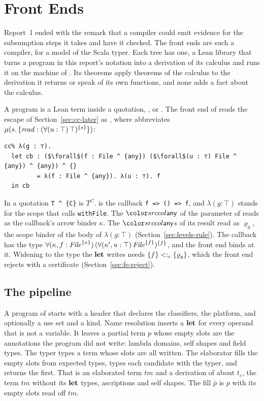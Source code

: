 \section{Front Ends}\label{sec:frontends}
\mathplain

Report~1 ended with the remark that a compiler could emit evidence for the subsumption steps it takes and have it checked. The front ends are such a compiler, for a model of the Scala typer. Each tree has one, a Lean library that turns a program in this report's notation into a derivation of its calculus and runs it on the machine of \DOTMNF. Its theorems apply theorems of the calculus to the derivation it returns or speak of its own functions, and none adds a fact about the calculus.

A program is a Lean term inside a quotation, ,  or . The front end of \treeCC reads the escape of Section~\ref{sec:cc-later} as , where  abbreviates $\mu(s.\,\{\mathit{read} : (\forall(u : \top)\,\top)^{\{s\}}\})$:
\begin{lstlisting}[mathescape=true]
cc% λ(g : ⊤).
  let cb : ($\forall$(f : File ^ {any}) ($\forall$(u : ⊤) File ^ {any}) ^ {any}) ^ {}
         = λ(f : File ^ {any}). λ(u : ⊤). f
  in cb
\end{lstlisting}
In a quotation \lstinline|T ^ {C}| is $T^{C}$.  is the callback \lstinline{f => () => f}, and $\lambda(g : \top)$ stands for the scope that calls \lstinline{withFile}. The $\cany$ of the parameter of  reads as the callback's arrow binder $\kappa$. The $\cany$s of its result read as $\varrho_g$, the scope binder of the body of $\lambda(g : \top)$ (Section~\ref{sec:levels-rule}). The callback has the type $\forall(\kappa, f : \mathit{File}^{\{\kappa\}})\,(\forall(\kappa', u : \top)\,\mathit{File}^{\{f\}})^{\{f\}}$, and the front end binds  at it. Widening  to the type the $\mathbf{let}$ writes needs $\{f\} <:_{c} \{\varrho_g\}$, which the front end rejects with a certificate (Section~\ref{sec:fe-reject}).

\subsection{The pipeline}\label{sec:fe-pipeline}

A program of \treeCL starts with a header that declares the classifiers, the platform, and optionally a use set and a kind. Name resolution inserts a $\mathbf{let}$ for every operand that is not a variable. It leaves a partial term $p$ whose empty slots are the annotations the program did not write: lambda domains, self shapes and field types. The typer types a term whose slots are all written. The elaborator fills the empty slots from expected types, types each candidate with the typer, and returns the first. That is an elaborated term $\mathit{tm}$ and a derivation of \DOTMNF about $t_c$, the term $\mathit{tm}$ without its $\mathbf{let}$ types, ascriptions and self shapes. The fill $\bar{p}$ is $p$ with its empty slots read off $\mathit{tm}$.

